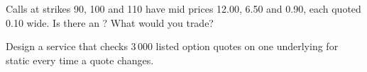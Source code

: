 \begin{interviewq}\label{iq:dv:no-arbitrage-and-the-fundamental-theorems:5}
Calls at strikes 90, 100 and 110 have mid prices 12.00, 6.50 and 0.90, each
quoted 0.10 wide. Is there an ? What would you trade?
\end{interviewq}

\begin{interviewq}\label{iq:dv:no-arbitrage-and-the-fundamental-theorems:6}
Design a service that checks 3\,000 listed option quotes on one underlying for
static  every time a quote changes.
\end{interviewq}
